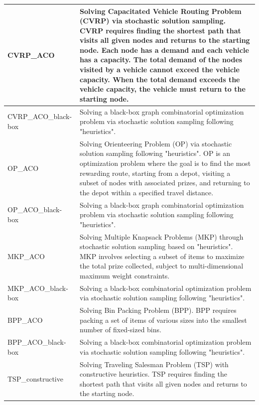 \begin{table}[!thp]
\begin{tabular}{l|p{10cm}}
    \midrule
    CVRP\_ACO & Solving Capacitated Vehicle Routing Problem (CVRP) via stochastic solution sampling. CVRP requires finding the shortest path that visits all given nodes and returns to the starting node. Each node has a demand and each vehicle has a capacity. The total demand of the nodes visited by a vehicle cannot exceed the vehicle capacity. When the total demand exceeds the vehicle capacity, the vehicle must return to the starting node. \\ \midrule
    CVRP\_ACO\_black-box & Solving a black-box graph combinatorial optimization problem via stochastic solution sampling following "heuristics".\\
    \midrule
    OP\_ACO & Solving Orienteering Problem (OP) via stochastic solution sampling following "heuristics". OP is an optimization problem where the goal is to find the most rewarding route, starting from a depot, visiting a subset of nodes with associated prizes, and returning to the depot within a specified travel distance. \\ \midrule
    OP\_ACO\_black-box & Solving a black-box graph combinatorial optimization problem via stochastic solution sampling following "heuristics".\\
    \midrule
    MKP\_ACO & Solving Multiple Knapsack Problems (MKP) through stochastic solution sampling based on "heuristics". MKP involves selecting a subset of items to maximize the total prize collected, subject to multi-dimensional maximum weight constraints.\\ \midrule
    MKP\_ACO\_black-box & Solving a black-box combinatorial optimization problem via stochastic solution sampling following "heuristics". \\
    \midrule
    BPP\_ACO & Solving Bin Packing Problem (BPP). BPP requires packing a set of items of various sizes into the smallest number of fixed-sized bins. \\ \midrule
    BPP\_ACO\_black-box & Solving a black-box combinatorial optimization problem via stochastic solution sampling following "heuristics".\\ \midrule
    TSP\_constructive & Solving Traveling Salesman Problem (TSP) with constructive heuristics. TSP requires finding the shortest path that visits all given nodes and returns to the starting node. \\
    \bottomrule
    \end{tabular}
    \label{tab: problem descriptions}
\end{table}


